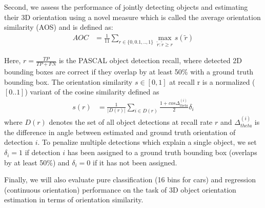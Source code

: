 Second, we assess the performance
of jointly detecting objects and estimating their 3D
orientation using a novel measure which is called the average
orientation similarity (AOS) \cite{Geiger2012CVPR} and is defined as:
\begin{align}
AOC & = \frac{1}{11} \sum_{r \in \{0,0.1,..,1\}} \max_{\tilde{r}:\tilde{r} \geq r} s(\tilde{r})
\end{align}

Here, $r = \frac{TP}{TP+FN}$ is the PASCAL object detection recall,
where detected 2D bounding boxes are correct if they overlap
by at least 50\% with a ground truth bounding box. The
orientation similarity $s \in [0, 1]$ at recall r is a normalized
($[0..1]$) variant of the cosine similarity defined as
\begin{align}
s(r) & = \frac{1}{|D(r)|} \sum_{i \in D(r)} \frac{1 + cos \Delta_{theta}^{(i)}}{2} \delta_i
\end{align}
where $D(r)$ denotes the set of all object detections at recall
rate 
$r$ and $\Delta_{theta}^{(i)}$
is the difference in angle between estimated
and ground truth orientation of detection $i$. To penalize multiple
detections which explain a single object, we set $\delta_i = 1$
if detection $i$ has been assigned to a ground truth bounding
box (overlaps by at least 50\%) and $\delta_i = 0$ if it has not been
assigned.

Finally, we will also evaluate pure classification (16 bins for
cars) and regression (continuous orientation) performance
on the task of 3D object orientation estimation in terms of
orientation similarity.



